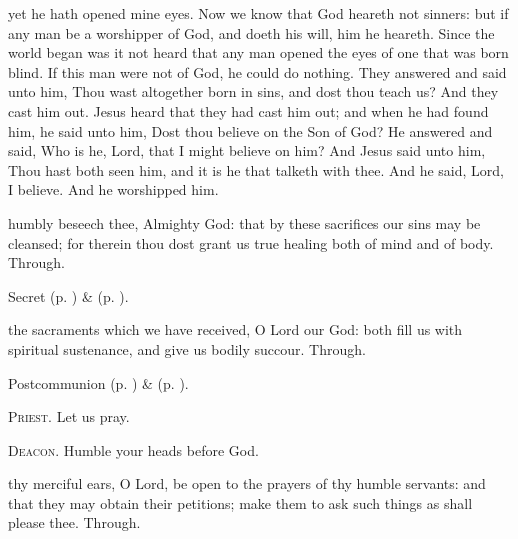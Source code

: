 yet he hath opened mine eyes. Now we know that God heareth not sinners: but if any man be a worshipper of God, and doeth his will, him he heareth. Since the world began was it not heard that any man opened the eyes of one that was born blind. If this man were not of God, he could do nothing. They answered and said unto him, Thou wast altogether born in sins, and dost thou teach us? And they cast him out. Jesus heard that they had cast him out; and when he had found him, he said unto him, Dost thou believe on the Son of God? He answered and said, Who is he, Lord, that I might believe on him? And Jesus said unto him, Thou hast both seen him, and it is he that talketh with thee. And he said, Lord, I believe.  And he worshipped him.


\secret
{} humbly beseech thee, Almighty God: that by these sacrifices our sins may be cleansed; for therein thou dost grant us true healing both of mind and of body. Through.

\begin{rubric}
     Secret  (p. \pageref{AshWednesdayMassSecret}) \&   (p. \pageref{SPLivingDeparted}).
\end{rubric}


\postcommunion
{} the sacraments which we have received, O Lord our God: both fill us with spiritual sustenance, and give us bodily succour. Through.


\begin{rubric}
     Postcommunion  (p. \pageref{AshWednesdayMassPostcommunion}) \&   (p. \pageref{SPLivingDeparted}).
\end{rubric}

\clearpage
\textsc{Priest.} Let us pray.\par
\textsc{Deacon.} Humble your heads before God.\par
{} thy merciful ears, O Lord, be open to the prayers of thy humble servants: and that they may obtain their petitions; make them to ask such things as shall please thee. Through.


